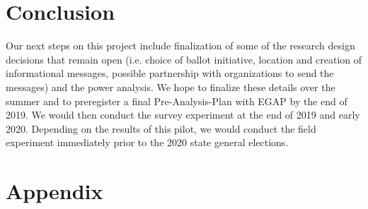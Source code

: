 \documentclass[12pt,final,fleqn]{article}
\theoremstyle{plain}
\begin{document}
\section{Conclusion} \label{sec:Conclusion}

Our next steps on this project include finalization of some of the research design decisions that remain open (i.e. choice of ballot initiative, location and creation of informational messages, possible partnership with organizations to send the messages) and the power analysis. We hope to finalize these details over the summer and to preregister a final Pre-Analysis-Plan with EGAP by the end of 2019. We would then conduct the survey experiment at the end of 2019 and early 2020. Depending on the results of this pilot, we would conduct the field experiment immediately prior to the 2020 state general elections. 



\clearpage
\pagebreak


\pagebreak

\appendix
\setcounter{table}{0}
\setcounter{figure}{0}
\renewcommand\thetable{\Alph{section}.\arabic{table}}
\renewcommand\thefigure{\Alph{section}.\arabic{figure}}

\section{Appendix} \label{Appendix}


\end{document}
